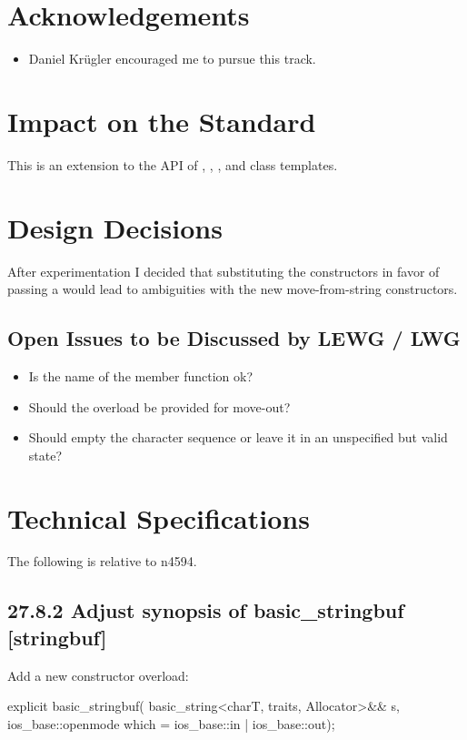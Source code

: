 \documentclass[ebook,11pt,article]{memoir}
\begin{document}
\chapter{Acknowledgements}
\begin{itemize}
\item Daniel Kr\"ugler encouraged me to pursue this track.
\end{itemize}




\chapter{Impact on the Standard}
This is an extension to the API of , , , and  class templates.
\chapter{Design Decisions}
After experimentation I decided that substituting the  constructors in favor of passing a  would lead to ambiguities with the new move-from-string constructors.
\section{Open Issues to be Discussed by LEWG / LWG}
\begin{itemize}
\item Is the name of the  member function ok?
\item Should the  overload be provided for move-out?
\item Should  empty the character sequence or leave it in an unspecified but valid state?
\end{itemize}

\chapter{Technical Specifications}
The following is relative to n4594.
\section{27.8.2 Adjust synopsis of basic\_stringbuf [stringbuf]}
Add a new constructor overload:
\begin{codeblock}
      explicit basic_stringbuf(
        basic_string<charT, traits, Allocator>&& s,
        ios_base::openmode which = ios_base::in | ios_base::out);
\end{codeblock}
\end{document}
